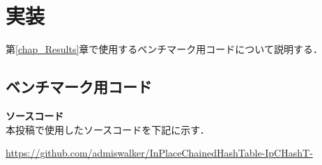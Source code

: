 \chapter{実装}
\label{chap_Implementation}

第\ref{chap_Results}章で使用するベンチマーク用コードについて説明する．

\section{ベンチマーク用コード}

{\bf ソースコード}
\samepage \\ \indent
本投稿で使用したソースコードを下記に示す．
\begin{center}
  \url{https://github.com/admiswalker/InPlaceChainedHashTable-IpCHashT-}
\end{center}

